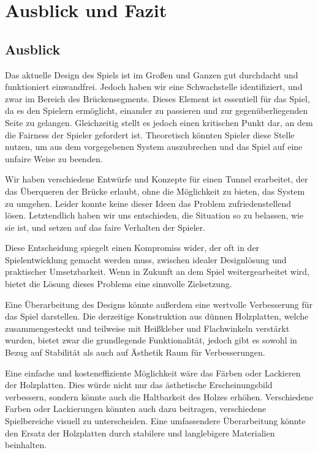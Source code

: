 \chapter{Ausblick und Fazit}

\section{Ausblick}

Das aktuelle Design des Spiels ist im Großen und Ganzen gut durchdacht und funktioniert einwandfrei. Jedoch haben wir eine Schwachstelle identifiziert, und zwar im Bereich des Brückensegments. Dieses Element ist essentiell für das Spiel, da es den Spielern ermöglicht, einander zu passieren und zur gegenüberliegenden Seite zu gelangen. Gleichzeitig stellt es jedoch einen kritischen Punkt dar, an dem die Fairness der Spieler gefordert ist. Theoretisch könnten Spieler diese Stelle nutzen, um aus dem vorgegebenen System auszubrechen und das Spiel auf eine unfaire Weise zu beenden.

Wir haben verschiedene Entwürfe und Konzepte für einen Tunnel erarbeitet, der das Überqueren der Brücke erlaubt, ohne die Möglichkeit zu bieten, das System zu umgehen. Leider konnte keine dieser Ideen das Problem zufriedenstellend lösen. Letztendlich haben wir uns entschieden, die Situation so zu belassen, wie sie ist, und setzen auf das faire Verhalten der Spieler.

Diese Entscheidung spiegelt einen Kompromiss wider, der oft in der Spielentwicklung gemacht werden muss, zwischen idealer Designlösung und praktischer Umsetzbarkeit. Wenn in Zukunft an dem Spiel weitergearbeitet wird, bietet die Lösung dieses Problems eine sinnvolle Zielsetzung.

Eine Überarbeitung des Designs könnte außerdem eine wertvolle Verbesserung für das Spiel darstellen. Die derzeitige Konstruktion aus dünnen Holzplatten, welche zusammengesteckt und teilweise mit Heißkleber und Flachwinkeln verstärkt wurden, bietet zwar die grundlegende Funktionalität, jedoch gibt es sowohl in Bezug auf Stabilität als auch auf Ästhetik Raum für Verbesserungen.

Eine einfache und kosteneffiziente Möglichkeit wäre das Färben oder Lackieren der Holzplatten. Dies würde nicht nur das ästhetische Erscheinungsbild verbessern, sondern könnte auch die Haltbarkeit des Holzes erhöhen. Verschiedene Farben oder Lackierungen könnten auch dazu beitragen, verschiedene Spielbereiche visuell zu unterscheiden. Eine umfassendere Überarbeitung könnte den Ersatz der Holzplatten durch stabilere und langlebigere Materialien beinhalten.

